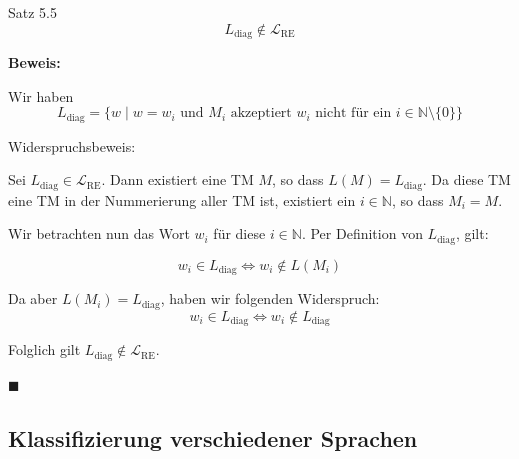 \documentclass[a4paper, 11pt]{article}
\def\N{\mathbb{N}}
\def\L{\mathcal{L}}
\begin{document}
        
            \begin{mainbox}{Satz 5.5}
                $$L_{\text{diag}} \notin \L_{\text{RE}}$$
            \end{mainbox}
        
            \textbf{Beweis:}
        
            Wir haben 
            $$L_{\text{diag}} = \{w \mid w = w_i \text{ und $M_i$ akzeptiert $w_i$ nicht für ein $i \in \N\setminus\{0\}$}\}$$
        
            Widerspruchsbeweis:
        
            Sei $L_\text{diag} \in \L_{\text{RE}}$. Dann existiert eine TM $M$, so dass $L(M) = L_\text{diag}$. Da diese TM eine TM in der Nummerierung aller TM ist, existiert ein $i \in \N$, so dass $M_i = M$.
        
            Wir betrachten nun das Wort $w_i$ für diese $i \in \N$. Per Definition von $L_\text{diag}$, gilt:
        
            $$w_i \in L_\text{diag} \iff w_i \notin L(M_i)$$
        
            Da aber $L(M_i) = L_\text{diag}$, haben wir folgenden Widerspruch:
            $$w_i \in L_\text{diag} \iff w_i \notin L_\text{diag}$$
        
            Folglich gilt $L_\text{diag} \notin \L_\text{RE}$.
            
            \hspace*{0pt}\hfill$\blacksquare$
        
        
            
                \subsection{Klassifizierung verschiedener Sprachen}
            
\end{document}

